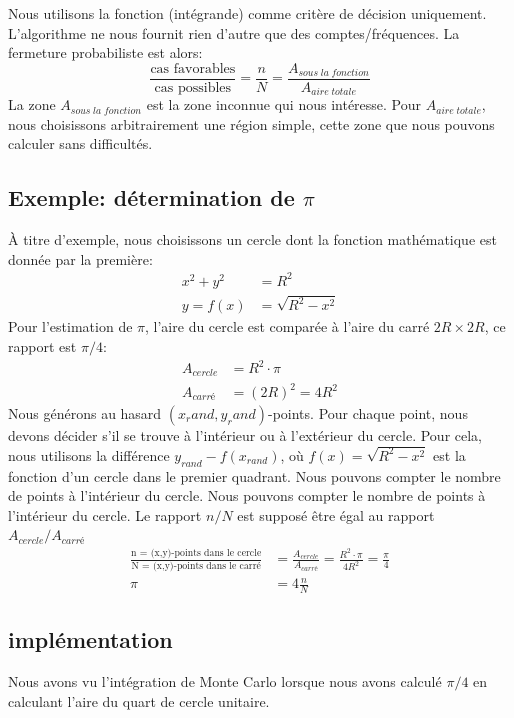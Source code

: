 \documentclass[%
oneside,                 %
final,                   %
10pt]{article}
\begin{document}
Nous utilisons la fonction (intégrande) comme critère de décision uniquement. L'algorithme ne nous fournit rien d'autre que des comptes/fréquences. La fermeture probabiliste est alors:
\begin{equation*}
\frac{\textrm{cas favorables}} {\textrm{cas possibles}} = \frac {n}{N} = \frac{A_{sous\;la\;fonction}}{A_{aire \;totale}}
\end{equation*}
La zone $A_{sous\;la\;fonction}$ est la zone inconnue qui nous intéresse. Pour $A_{aire \;totale}$, nous choisissons arbitrairement une région simple, cette zone que nous pouvons calculer sans difficultés.

\subsection{Exemple: détermination de $\pi$}
À titre d'exemple, nous choisissons un cercle dont la fonction mathématique est donnée par la première:
\begin{align*}
x^2 + y^2 &= R^2 \\
y = f(x) &= \sqrt{R^2 - x^2}
\end{align*}
Pour l'estimation de $\pi$, l'aire du cercle est comparée à l'aire du carré $2R \times 2R$, ce rapport est $\pi / 4$:
\begin{align*}
A_{cercle} &= R^2 \cdot \pi \\
A_{carré} &= {(2R)}^2 = 4R^2
\end{align*}
Nous générons au hasard $(x_rand, y_rand)$-points. Pour chaque point, nous devons décider s'il se trouve à l'intérieur ou à l'extérieur du cercle. Pour cela, nous utilisons la différence $y_{rand} - f(x_{rand})$, où $f(x) = \sqrt{R^2 - x^2}$ est la fonction d'un cercle dans le premier quadrant. Nous pouvons compter le nombre de points à l'intérieur du cercle. Nous pouvons compter le nombre de points à l'intérieur du cercle. Le rapport $n / N$ est supposé être égal au rapport $A_{cercle}/A_{carré}$
\begin{align*}
\frac {\textrm{n = (x,y)-points dans le cercle}}  {\textrm{N = (x,y)-points dans le carré}} &= \frac{A_{cercle}}{A_{carré}}
 = \frac {R^2 \cdot \pi}{4R^2 } = \frac {\pi}{4} \\
\pi &= 4\frac{n}{N}
\end{align*}
\subsection{implémentation}
Nous avons vu l'intégration de Monte Carlo lorsque nous avons calculé $\pi / 4$ en calculant l'aire du quart de cercle unitaire.
\end{document}
